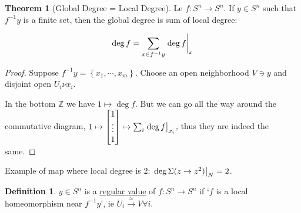 \documentclass{article}
\theoremstyle{definition}
\newtheorem*{definition}{Definition}
\newtheorem{theorem}{Theorem}
\begin{document}
    \begin{theorem}
        [Global Degree = Local Degree] Le \(f: S^n \to S^n\). If \(y\in S^n\) such that \(f ^{-1} y\) is a finite set, then the global degree is sum of local degree:
        
        \[
            \deg f = \sum_{x\in f ^{-1} y} \eval{\deg f}_x
        \]
    \end{theorem}

    \begin{proof}
        Suppose \(f ^{-1} y = \left\{ x_1, \cdots , x_m \right\} \). Choose an open neighborhood \(V \ni y\) and disjoint open \(U_i \nu x_i\).
        
        \begin{center}
        \end{center}

        In the bottom \(\mathbb{Z}\) we have \(1 \mapsto \deg f\). But we can go all the way around the commutative diagram, \(1 \mapsto \begin{bmatrix}
            1 \\
            \vdots \\
            1 \\
        \end{bmatrix} \mapsto \sum_{i} \eval{\deg f}_{x_i}\), thus they are indeed the same. 

    \end{proof}

    Example of map where local degree is \(2\): \(\eval{\deg \Sigma(z \to z^2)}_{N} = 2\). 

    \begin{definition}
        \(y\in S^n\) is a \underline{regular value} of \(f: S^n \to S^n\) if `\(f\) is a local homeomorphism near \(f ^{-1} y\)', ie \(U_i \xrightarrow{\approx} V \forall i\). 
    \end{definition}
\end{document}
